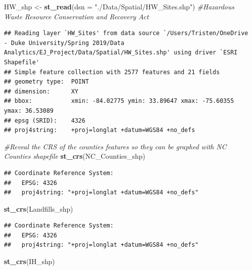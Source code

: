 \documentclass[12pt,]{article}
\newenvironment{Shaded}{\begin{snugshade}}{\end{snugshade}}
\newcommand{\KeywordTok}[1]{\textcolor[rgb]{0.13,0.29,0.53}{\textbf{#1}}}
\newcommand{\DataTypeTok}[1]{\textcolor[rgb]{0.13,0.29,0.53}{#1}}
\newcommand{\StringTok}[1]{\textcolor[rgb]{0.31,0.60,0.02}{#1}}
\newcommand{\CommentTok}[1]{\textcolor[rgb]{0.56,0.35,0.01}{\textit{#1}}}
\newcommand{\NormalTok}[1]{#1}
\begin{document}
\begin{Shaded}
\begin{Highlighting}[]
\NormalTok{HW_shp <-}\StringTok{ }\KeywordTok{st_read}\NormalTok{(}\DataTypeTok{dsn =} \StringTok{"./Data/Spatial/HW_Sites.shp"}\NormalTok{) }\CommentTok{#Hazardous Waste Resource Conservation and Recovery Act}
\end{Highlighting}
\end{Shaded}

\begin{verbatim}
## Reading layer `HW_Sites' from data source `/Users/Tristen/OneDrive - Duke University/Spring 2019/Data Analytics/EJ_Project/Data/Spatial/HW_Sites.shp' using driver `ESRI Shapefile'
## Simple feature collection with 2577 features and 21 fields
## geometry type:  POINT
## dimension:      XY
## bbox:           xmin: -84.02775 ymin: 33.89647 xmax: -75.60355 ymax: 36.53089
## epsg (SRID):    4326
## proj4string:    +proj=longlat +datum=WGS84 +no_defs
\end{verbatim}

\begin{Shaded}
\begin{Highlighting}[]
\CommentTok{#Reveal the CRS of the counties features so they can be graphed with NC Counties shapefile}
\KeywordTok{st_crs}\NormalTok{(NC_Counties_shp)}
\end{Highlighting}
\end{Shaded}

\begin{verbatim}
## Coordinate Reference System:
##   EPSG: 4326 
##   proj4string: "+proj=longlat +datum=WGS84 +no_defs"
\end{verbatim}

\begin{Shaded}
\begin{Highlighting}[]
\KeywordTok{st_crs}\NormalTok{(Landfills_shp)}
\end{Highlighting}
\end{Shaded}

\begin{verbatim}
## Coordinate Reference System:
##   EPSG: 4326 
##   proj4string: "+proj=longlat +datum=WGS84 +no_defs"
\end{verbatim}

\begin{Shaded}
\begin{Highlighting}[]
\KeywordTok{st_crs}\NormalTok{(IH_shp)}
\end{Highlighting}
\end{Shaded}
\end{document}
